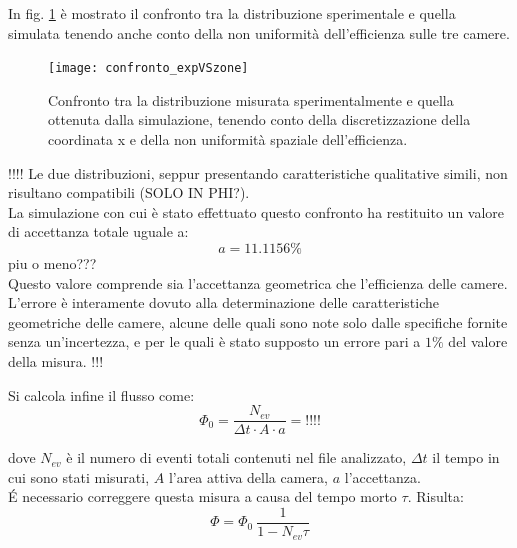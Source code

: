 \documentclass[8pt]{extarticle}
\begin{document}
In fig. \ref{fig:confronto_expVSzone} è mostrato il confronto tra la distribuzione sperimentale e quella simulata tenendo anche conto della non uniformità dell'efficienza sulle tre camere. 

\begin{figure}
\begin{center}
\texttt{[image: confronto\_expVSzone]}
\caption{Confronto tra la distribuzione misurata sperimentalmente e quella ottenuta dalla simulazione, tenendo conto della discretizzazione della coordinata x e della non uniformità spaziale dell'efficienza.}
\label{fig:confronto_expVSzone}
\end{center}
\end{figure}

!!!! Le due distribuzioni, seppur presentando caratteristiche qualitative simili, non risultano compatibili (SOLO IN PHI?). \\

La simulazione con cui è stato effettuato questo confronto ha restituito un valore di accettanza totale uguale a: \\

\[ a = 11.1156 \% \] piu o meno??? \\

Questo valore comprende sia l'accettanza geometrica che l'efficienza delle camere. L'errore è interamente dovuto alla determinazione delle caratteristiche geometriche delle camere, alcune delle quali sono note solo dalle specifiche fornite senza un'incertezza, e per le quali è stato supposto un errore pari a $1\%$ del valore della misura. !!! 
 
Si calcola infine il flusso come: \\

\[ \Phi_0 = \frac{N_{ev}}{\Delta t \cdot A \cdot a} = !!!! \]

dove $N_{ev}$ è il numero di eventi totali contenuti nel file analizzato, $\Delta t$ il tempo in cui sono stati misurati, $A$ l'area attiva della camera, $a$ l'accettanza. \\

\'E necessario correggere questa misura a causa del tempo morto $\tau$. Risulta: \\

\[ \Phi = \Phi_0 \ \frac{1}{1-N_{ev}\tau} \]
\end{document}
